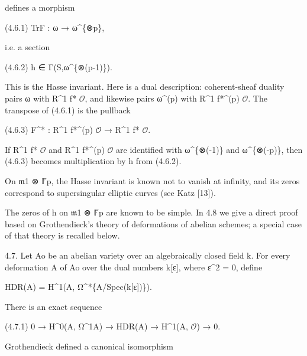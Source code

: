 \documentclass[11pt,a4paper]{article}
\begin{document}
defines a morphism

(4.6.1)        Tr\textunderscore{}F : ω → ω\textasciicircum{}\{⊗p\},

i.e. a section

(4.6.2)        h ∈ Γ(S,ω\textasciicircum{}\{⊗(p-1)\}).

This is the Hasse invariant. Here is a dual description: coherent-sheaf duality pairs ω with R\textasciicircum{}1 f\textunderscore{}* \ensuremath{\mathcal{O}}, and likewise pairs ω\textasciicircum{}(p) with R\textasciicircum{}1 f\textunderscore{}*\textasciicircum{}(p) \ensuremath{\mathcal{O}}. The transpose of (4.6.1) is the pullback

(4.6.3)        F\textasciicircum{}* : R\textasciicircum{}1 f\textunderscore{}*\textasciicircum{}(p) \ensuremath{\mathcal{O}} → R\textasciicircum{}1 f\textunderscore{}* \ensuremath{\mathcal{O}}.

If R\textasciicircum{}1 f\textunderscore{}* \ensuremath{\mathcal{O}} and R\textasciicircum{}1 f\textunderscore{}*\textasciicircum{}(p) \ensuremath{\mathcal{O}} are identified with ω\textasciicircum{}\{⊗(-1)\} and ω\textasciicircum{}\{⊗(-p)\}, then (4.6.3) becomes multiplication by h from (4.6.2).

On \ensuremath{\mathfrak{m}}\textunderscore{}1 ⊗ \ensuremath{\mathbb{F}}̄\textunderscore{}p, the Hasse invariant is known not to vanish at infinity, and its zeros correspond to supersingular elliptic curves (see Katz [13]).

The zeros of h on \ensuremath{\mathfrak{m}}\textunderscore{}1 ⊗ \ensuremath{\mathbb{F}}̄\textunderscore{}p are known to be simple. In 4.8 we give a direct proof based on Grothendieck's theory of deformations of abelian schemes; a special case of that theory is recalled below.

4.7. Let A\textunderscore{}o be an abelian variety over an algebraically closed field k. For every deformation A of A\textunderscore{}o over the dual numbers k[ε], where ε\textasciicircum{}2 = 0, define

H\textunderscore{}DR(A) = H\textasciicircum{}1(A, Ω\textasciicircum{}*\textunderscore{}\{A/Spec(k[ε])\}).

There is an exact sequence

(4.7.1)        0 → H\textasciicircum{}0(A, Ω\textasciicircum{}1\textunderscore{}A) → H\textunderscore{}DR(A) → H\textasciicircum{}1(A, \ensuremath{\mathcal{O}}) → 0.

Grothendieck defined a canonical isomorphism
\end{document}
